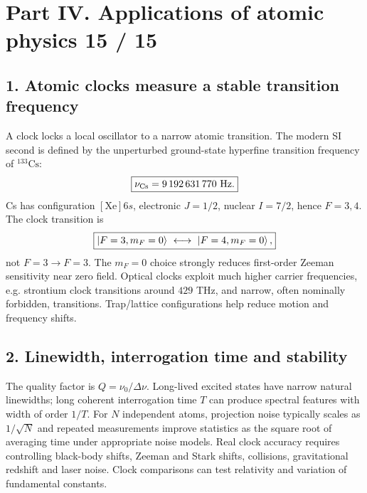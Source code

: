 
\section*{Part IV. Applications of atomic physics \hfill 15 / 15}
\subsection*{1. Atomic clocks measure a stable transition frequency}
A clock locks a local oscillator to a narrow atomic transition.
The modern SI second is defined by the unperturbed ground-state
hyperfine transition frequency of \(^{133}\mathrm{Cs}\):
\[
\boxed{\nu_{\rm Cs}=9\,192\,631\,770\ \mathrm{Hz}.}
\]
Cs has configuration \([\mathrm{Xe}]6s\), electronic
\(J=1/2\), nuclear \(I=7/2\), hence \(F=3,4\).
The clock transition is
\[
\boxed{\left\lvert F=3,m_F=0\right\rangle\ \longleftrightarrow\
\left\lvert F=4,m_F=0\right\rangle,}
\]
not \(F=3\to F=3\). The \(m_F=0\) choice strongly reduces
first-order Zeeman sensitivity near zero field.
Optical clocks exploit much higher carrier frequencies,
e.g. strontium clock transitions around \(429\) THz,
and narrow, often nominally forbidden, transitions.
Trap/lattice configurations help reduce motion and
frequency shifts.

\subsection*{2. Linewidth, interrogation time and stability}
The quality factor is \(Q=\nu_0/\Delta\nu\).
Long-lived excited states have narrow natural linewidths;
long coherent interrogation time \(T\) can produce spectral
features with width of order \(1/T\).
For \(N\) independent atoms, projection noise typically
scales as \(1/\sqrt N\) and repeated measurements improve
statistics as the square root of averaging time under
appropriate noise models. Real clock accuracy requires
controlling black-body shifts, Zeeman and Stark shifts,
collisions, gravitational redshift and laser noise.
Clock comparisons can test relativity and variation of
fundamental constants.

